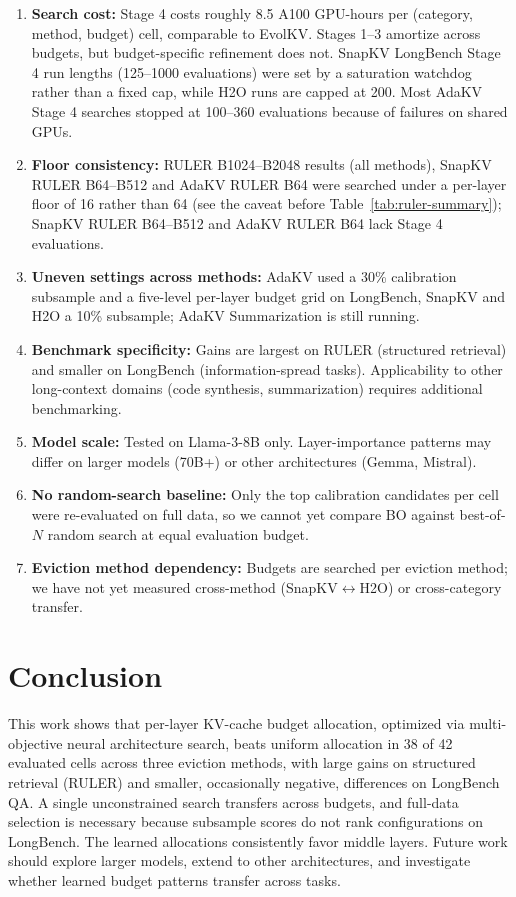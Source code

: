 \documentclass[11pt]{article}
\begin{document}
\begin{enumerate}
\item \textbf{Search cost:} Stage 4 costs roughly 8.5 A100 GPU-hours per (category, method, budget) cell, comparable to EvolKV. Stages 1--3 amortize across budgets, but budget-specific refinement does not. SnapKV LongBench Stage 4 run lengths (125--1000 evaluations) were set by a saturation watchdog rather than a fixed cap, while H2O runs are capped at 200. Most AdaKV Stage 4 searches stopped at 100--360 evaluations because of failures on shared GPUs.
\item \textbf{Floor consistency:} RULER B1024--B2048 results (all methods), SnapKV RULER B64--B512 and AdaKV RULER B64 were searched under a per-layer floor of 16 rather than 64 (see the caveat before Table~\ref{tab:ruler-summary}); SnapKV RULER B64--B512 and AdaKV RULER B64 lack Stage 4 evaluations.
\item \textbf{Uneven settings across methods:} AdaKV used a 30\% calibration subsample and a five-level per-layer budget grid on LongBench, SnapKV and H2O a 10\% subsample; AdaKV Summarization is still running.
\item \textbf{Benchmark specificity:} Gains are largest on RULER (structured retrieval) and smaller on LongBench (information-spread tasks). Applicability to other long-context domains (code synthesis, summarization) requires additional benchmarking.
\item \textbf{Model scale:} Tested on Llama-3-8B only. Layer-importance patterns may differ on larger models (70B+) or other architectures (Gemma, Mistral).
\item \textbf{No random-search baseline:} Only the top calibration candidates per cell were re-evaluated on full data, so we cannot yet compare BO against best-of-$N$ random search at equal evaluation budget.
\item \textbf{Eviction method dependency:} Budgets are searched per eviction method; we have not yet measured cross-method (SnapKV$\leftrightarrow$H2O) or cross-category transfer.
\end{enumerate}

\section{Conclusion}

This work shows that per-layer KV-cache budget allocation, optimized via multi-objective neural architecture search, beats uniform allocation in 38 of 42 evaluated cells across three eviction methods, with large gains on structured retrieval (RULER) and smaller, occasionally negative, differences on LongBench QA. A single unconstrained search transfers across budgets, and full-data selection is necessary because subsample scores do not rank configurations on LongBench. The learned allocations consistently favor middle layers. Future work should explore larger models, extend to other architectures, and investigate whether learned budget patterns transfer across tasks.




\end{document}
